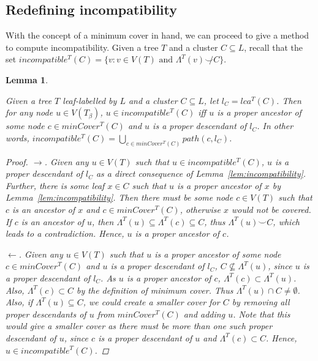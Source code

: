 \documentclass[12pt,a4paper]{article}
\newcommand{\compatible}{\smile}
\newcommand{\leafset}{\Lambda}
\newcommand{\TB}{T_\beta}
\newtheorem{incompatibilitymincover}[incompatibility]{Lemma}
\begin{document}
    \subsection{Redefining incompatibility}
    \label{subsec:redefiningincompatibility}

    With the concept of a minimum cover in hand, we can proceed to give a method to compute incompatibility. Given a tree $T$ and a cluster $C \subseteq L$, recall that the set $incompatible^{T}(C) = \{v : v \in V(T) \text{ and } \leafset^{T}(v) \not\compatible C\}$.
    \newline

    \begin{incompatibilitymincover}
        \label{lem:incompatibilitymincover}

        Given a tree $T$ leaf-labelled by $L$ and a cluster $C \subseteq L$, let $l_C = lca^{T}(C)$. Then for any node $u \in V(\TB)$, $u \in incompatible^{T}(C)$ iff $u$ is a proper ancestor of some node $c \in minCover^{T}(C)$ and $u$ is a proper descendant of $l_C$. In other words, $incompatible^{T}(C) = \bigcup_{c \in minCover^{T}(C)} path(c, l_C)$.

        \begin{proof}
            $\longrightarrow$. Given any $u \in V(T)$ such that $u \in incompatible^{T}(C)$, $u$ is a proper descendant of $l_C$ as a direct consequence of Lemma~\ref{lem:incompatibility}. Further, there is some leaf $x \in C$ such that $u$ is a proper ancestor of $x$ by Lemma~\ref{lem:incompatibility}. Then there must be some node $c \in V(T)$ such that $c$ is an ancestor of $x$ and $c \in minCover^{T}(C)$, otherwise $x$ would not be covered. If $c$ is an ancestor of $u$, then $\leafset^{T}(u) \subseteq \leafset^{T}(c) \subseteq C$, thus $\leafset^{T}(u) \compatible C$, which leads to a contradiction. Hence, $u$ is a proper ancestor of $c$.

            $\longleftarrow$. Given any $u \in V(T)$ such that $u$ is a proper ancestor of some node $c \in minCover^{T}(C)$ and $u$ is a proper descendant of $l_C$, $C \not\subseteq \leafset^{T}(u)$, since $u$ is a proper descendant of $l_C$. As $u$ is a proper ancestor of $c$, $\leafset^{T}(c) \subset \leafset^{T}(u)$. Also, $\leafset^{T}(c) \subset C$ by the definition of minimum cover. Thus $\leafset^{T}(u) \cap C \neq \emptyset$. Also, if $\leafset^{T}(u) \subseteq C$, we could create a smaller cover for $C$ by removing all proper descendants of $u$ from $minCover^{T}(C)$ and adding $u$. Note that this would give a smaller cover as there must be more than one such proper descendant of $u$, since $c$ is a proper descendant of $u$ and $\leafset^{T}(c) \subset C$. Hence, $u \in incompatible^{T}(C)$.
        \end{proof}
    \end{incompatibilitymincover}
\end{document}
